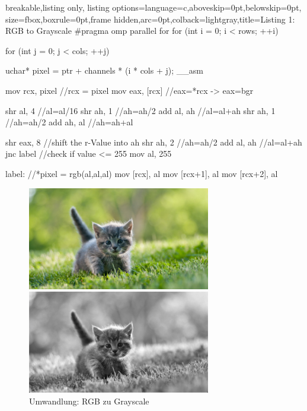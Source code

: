 \documentclass[11pt]{amsart}
\begin{document}
  \begin{tcblisting}{breakable,listing only,
  listing options={language=c,aboveskip=0pt,belowskip=0pt},
  size=fbox,boxrule=0pt,frame hidden,arc=0pt,colback=lightgray,title=Listing 1: RGB to Grayscale}
#pragma omp parallel for
     for (int i = 0; i < rows; ++i) {
         for (int j = 0; j < cols; ++j) {
             uchar* pixel = ptr + channels * (i * cols + j);
             __asm {
                     mov rcx, pixel    //rcx = pixel
                     mov eax, [rcx]    //eax=*rcx   -> eax=bgr

                     shr al, 4    //al=al/16
                     shr ah, 1    //ah=ah/2
                     add al, ah   //al=al+ah	    
                     shr ah, 1    //ah=ah/2
                     add ah, al  //ah=ah+al

                     shr eax, 8    //shift the r-Value into ah
                     shr ah, 2    //ah=ah/2
                     add al, ah  //al=al+ah    	
                     jnc label    //check if value <= 255 
                     mov al, 255

             label:
             	    //*pixel = rgb(al,al,al)
                     mov [rcx], al  
                     mov [rcx+1], al
                     mov [rcx+2], al
             }
         }
     }
\end{tcblisting}
\newpage
\begin{figure}[thb!]
\begin{minipage}{8cm}
\includegraphics[width=8cm]{images/original.jpg}
\end{minipage}
\qquad
\begin{minipage}{8cm}
\includegraphics[width=8cm]{images/myRGB.png}
\end{minipage}
\caption{Umwandlung: RGB zu Grayscale}
\label{fig:grayscaleExample}
\end{figure}
\end{document}
